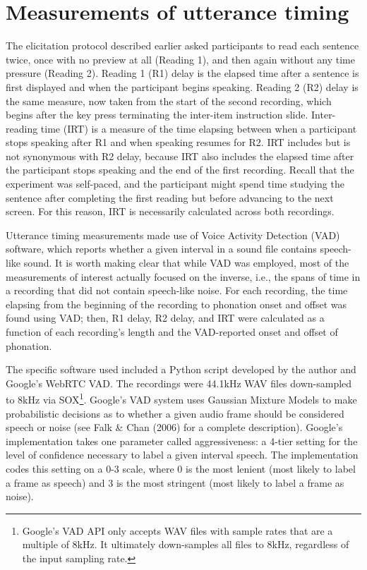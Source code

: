 \documentclass[11pt,oneside]{book}
\let\rmarkdownfootnote\footnote%
\def\footnote{\protect\rmarkdownfootnote}
\begin{document}
\hypertarget{method-irt}{%
\section{Measurements of utterance timing}\label{method-irt}}

The elicitation protocol described earlier asked participants to read each sentence twice, once with no preview at all (Reading 1), and then again without any time pressure (Reading 2). Reading 1 (R1) delay is the elapsed time after a sentence is first displayed and when the participant begins speaking. Reading 2 (R2) delay is the same measure, now taken from the start of the second recording, which begins after the key press terminating the inter-item instruction slide. Inter-reading time (IRT) is a measure of the time elapsing between when a participant stops speaking after R1 and when speaking resumes for R2. IRT includes but is not synonymous with R2 delay, because IRT also includes the elapsed time after the participant stops speaking and the end of the first recording. Recall that the experiment was self-paced, and the participant might spend time studying the sentence after completing the first reading but before advancing to the next screen. For this reason, IRT is necessarily calculated across both recordings.

Utterance timing measurements made use of Voice Activity Detection (VAD) software, which reports whether a given interval in a sound file contains speech-like sound. It is worth making clear that while VAD was employed, most of the measurements of interest actually focused on the inverse, i.e., the spans of time in a recording that did not contain speech-like noise. For each recording, the time elapsing from the beginning of the recording to phonation onset and offset was found using VAD; then, R1 delay, R2 delay, and IRT were calculated as a function of each recording's length and the VAD-reported onset and offset of phonation.

The specific software used included a Python script developed by the author and Google's WebRTC VAD. The recordings were 44.1kHz WAV files down-sampled to 8kHz via SOX\footnote{Google's VAD API only accepts WAV files with sample rates that are a multiple of 8kHz. It ultimately down-samples all files to 8kHz, regardless of the input sampling rate.}. Google's VAD system uses Gaussian Mixture Models to make probabilistic decisions as to whether a given audio frame should be considered speech or noise (see Falk \& Chan (2006) for a complete description). Google's implementation takes one parameter called aggressiveness: a 4-tier setting for the level of confidence necessary to label a given interval speech. The implementation codes this setting on a 0-3 scale, where 0 is the most lenient (most likely to label a frame as speech) and 3 is the most stringent (most likely to label a frame as noise).
\end{document}

